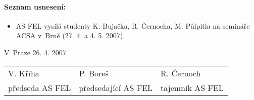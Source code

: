 \documentclass[a4paper,12pt,notitlepage,oneside]{article}
\begin{document}
\paragraph{Seznam usnesení:}
\begin{itemize}
\item AS FEL vysílá studenty K. Bujačka, R. Černocha, M. Půlpitla na semináře ACSA v~Brně (27. 4. a 4. 5. 2007).
\end{itemize}



\bigskip\bigskip\bigskip

V~Praze 26. 4. 2007

\bigskip\bigskip

\begin{center}
\begin{tabular}{p{4cm}p{4cm}p{4cm}}
V. Kříha & P. Boreš & R. Černoch \\
předseda AS FEL & předsedající AS FEL & tajemník AS FEL
\end{tabular}
\end{center}
\end{document}
